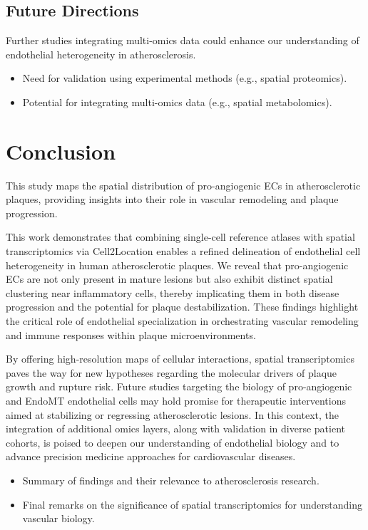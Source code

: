 \documentclass[a4paper,12pt]{article}
\begin{document}
\subsection{Future Directions}
Further studies integrating multi-omics data could enhance our understanding of endothelial heterogeneity in atherosclerosis.

\begin{itemize}
  \item Need for validation using experimental methods (e.g., spatial proteomics).
  \item Potential for integrating multi-omics data (e.g., spatial metabolomics).
\end{itemize}



\section{Conclusion}
This study maps the spatial distribution of pro-angiogenic ECs in atherosclerotic plaques, providing insights into their role in vascular remodeling and plaque progression.

This work demonstrates that combining single-cell reference atlases with spatial transcriptomics via Cell2Location enables a refined delineation of endothelial cell heterogeneity in human atherosclerotic plaques. We reveal that pro-angiogenic ECs are not only present in mature lesions but also exhibit distinct spatial clustering near inflammatory cells, thereby implicating them in both disease progression and the potential for plaque destabilization. These findings highlight the critical role of endothelial specialization in orchestrating vascular remodeling and immune responses within plaque microenvironments.

By offering high-resolution maps of cellular interactions, spatial transcriptomics paves the way for new hypotheses regarding the molecular drivers of plaque growth and rupture risk. Future studies targeting the biology of pro-angiogenic and EndoMT endothelial cells may hold promise for therapeutic interventions aimed at stabilizing or regressing atherosclerotic lesions. In this context, the integration of additional omics layers, along with validation in diverse patient cohorts, is poised to deepen our understanding of endothelial biology and to advance precision medicine approaches for cardiovascular diseases.

\begin{itemize}
  \item Summary of findings and their relevance to atherosclerosis research.
  \item Final remarks on the significance of spatial transcriptomics for understanding vascular biology.
\end{itemize}
\end{document}
